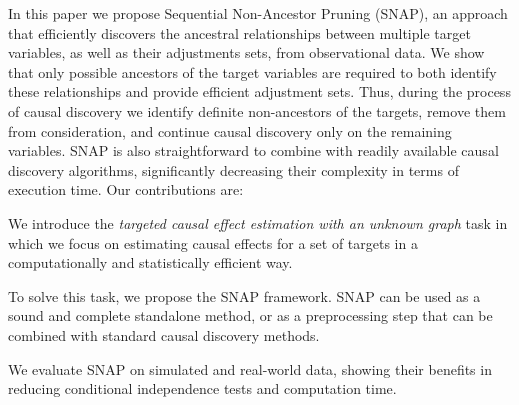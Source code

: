 In this paper we propose Sequential Non-Ancestor Pruning (SNAP), an approach that efficiently discovers the ancestral relationships between multiple target variables, as well as their adjustments sets, from observational data.
We show that only possible ancestors of the target variables are required to both identify these relationships and provide efficient adjustment sets.
Thus, during the process of causal discovery we identify definite non-ancestors of the targets, remove them from consideration, and continue causal discovery only on the remaining variables.
SNAP is also straightforward to combine with readily available causal discovery algorithms, significantly decreasing their complexity in terms of execution time.
Our contributions are:
\begin{compactitem}
   \item We introduce the \emph{targeted causal effect estimation with an unknown graph} task in which we focus on estimating causal effects for a set of targets in a computationally and statistically efficient way.
    \item To solve this task, we propose the \ac{SNAP} framework.
    SNAP can be used as a sound and complete standalone method,
    or as a preprocessing  step that can be combined with standard causal discovery methods.
    \item We evaluate  \ac{SNAP} on simulated and real-world data, showing their benefits in reducing conditional independence tests and computation time.
\end{compactitem}


